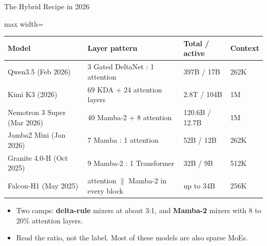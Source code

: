 \begin{frame}{The Hybrid Recipe in 2026}
    \begin{center}
    \small
    \renewcommand{\arraystretch}{1.2}
    \begin{adjustbox}{max width=\linewidth}\begin{tabular}{llll}
        \toprule
        \textbf{Model} & \textbf{Layer pattern} & \textbf{Total / active} & \textbf{Context} \\
        \midrule
        Qwen3.5 (Feb 2026) & 3 Gated DeltaNet : 1 attention & 397B / 17B & 262K \\
        Kimi K3 (2026) & 69 KDA + 24 attention layers & 2.8T / 104B & 1M \\
        Nemotron 3 Super (Mar 2026) & 40 Mamba-2 + 8 attention & 120.6B / 12.7B & 1M \\
        Jamba2 Mini (Jan 2026) & 7 Mamba : 1 attention & 52B / 12B & 262K \\
        Granite 4.0-H (Oct 2025) & 9 Mamba-2 : 1 Transformer & 32B / 9B & 512K \\
        Falcon-H1 (May 2025) & attention $\parallel$ Mamba-2 in every block & up to 34B & 256K \\
        \bottomrule
    \end{tabular}\end{adjustbox}
    \end{center}
    \begin{itemize}\itemsep0.4em
        \item Two camps: \textbf{delta-rule} mixers at about 3:1, and \textbf{Mamba-2} mixers with 8 to 20\% attention layers.
        \item Read the ratio, not the label. Most of these models are also sparse MoEs.
    \end{itemize}
\end{frame}

